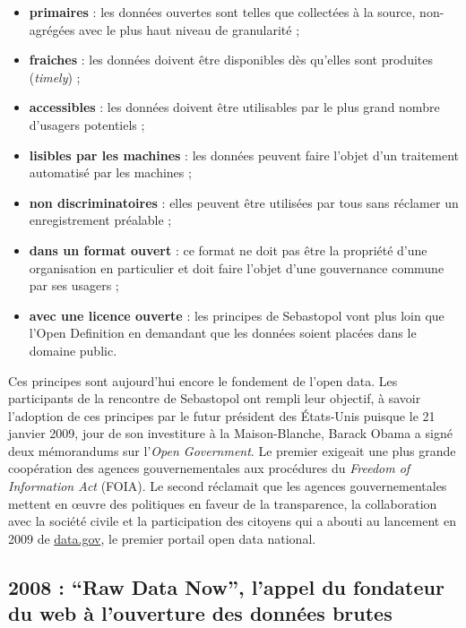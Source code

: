 \documentclass[]{book}
\theoremstyle{definition}
\theoremstyle{definition}
\theoremstyle{definition}
\theoremstyle{remark}
\begin{document}
\begin{itemize}
\item
  \textbf{primaires} : les données ouvertes sont telles que collectées à
  la source, non-agrégées avec le plus haut niveau de granularité ;
\item
  \textbf{fraiches} : les données doivent être disponibles dès qu'elles
  sont produites (\emph{timely}) ;
\item
  \textbf{accessibles} : les données doivent être utilisables par le
  plus grand nombre d'usagers potentiels ;
\item
  \textbf{lisibles par les machines} : les données peuvent faire l'objet
  d'un traitement automatisé par les machines ;
\item
  \textbf{non discriminatoires} : elles peuvent être utilisées par tous
  sans réclamer un enregistrement préalable ;
\item
  \textbf{dans un format ouvert} : ce format ne doit pas être la
  propriété d'une organisation en particulier et doit faire l'objet
  d'une gouvernance commune par ses usagers ;
\item
  \textbf{avec une licence ouverte} : les principes de Sebastopol vont
  plus loin que l'Open Definition en demandant que les données soient
  placées dans le domaine public.
\end{itemize}

Ces principes sont aujourd'hui encore le fondement de l'open data. Les
participants de la rencontre de Sebastopol ont rempli leur objectif, à
savoir l'adoption de ces principes par le futur président des États-Unis
puisque le 21 janvier 2009, jour de son investiture à la Maison-Blanche,
Barack Obama a signé deux mémorandums sur l'\emph{Open Government}. Le
premier exigeait une plus grande coopération des agences
gouvernementales aux procédures du \emph{Freedom of Information Act}
(FOIA). Le second réclamait que les agences gouvernementales mettent en
œuvre des politiques en faveur de la transparence, la collaboration avec
la société civile et la participation des citoyens qui a abouti au
lancement en 2009 de \url{data.gov}, le premier portail open data
national.

\subsection{\texorpdfstring{2008 : ``Raw Data Now'', l'appel du
fondateur du web à l'ouverture des données
brutes}{2008 : Raw Data Now, l'appel du fondateur du web à l'ouverture des données brutes}}\label{raw-data-now-lappel-du-fondateur-du-web-a-louverture-des-donnees-brutes}
\end{document}
